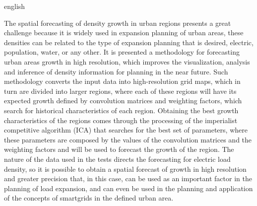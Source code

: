 \begin{resumo}[Abstract]
 \begin{otherlanguage*}{english}

The spatial forecasting of density growth in urban regions presents a great challenge because it is widely used in expansion planning of urban areas, these densities can be related to the type of expansion planning that is desired, electric, population, water, or any other. It is presented a methodology for forecasting urban areas growth in high resolution, which improves the visualization, analysis and inference of density information for planning in the near future. Such methodology converts the input data into high-resolution grid maps, which in turn are divided into larger regions, where each of these regions will have its expected growth defined by convolution matrices and weighting factors, which search for historical characteristics of each region. Obtaining the best growth characteristics of the regions comes through the processing of the imperialist competitive algorithm (ICA) that searches for the best set of parameters, where these parameters are composed by the values of the convolution matrices and the weighting factors and will be used to forecast the growth of the region. The nature of the data used in the tests directs the forecasting for electric load density, so it is possible to obtain a spatial forecast of growth in high resolution and greater precision that, in this case, can be used as an important factor in the planning of load expansion, and can even be used in the planning and application of the concepts of smartgrids in the defined urban area.

 \end{otherlanguage*}
\end{resumo}